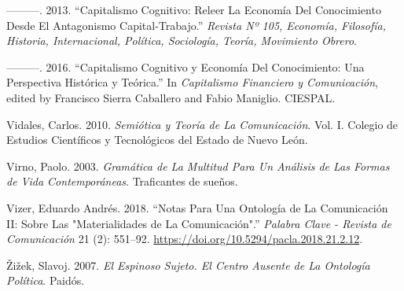 \documentclass[
]{interact}
\newlength{\cslhangindent}
\newenvironment{CSLReferences}[2] %
 {\begin{list}{}{%
  \setlength{\itemindent}{0pt}
  \setlength{\leftmargin}{0pt}
  \setlength{\parsep}{0pt}
  \ifodd #1
   \setlength{\leftmargin}{\cslhangindent}
   \setlength{\itemindent}{-1\cslhangindent}
  \fi
  \setlength{\itemsep}{#2\baselineskip}}}
 {\end{list}}
\begin{document}
\begin{CSLReferences}{1}{0}
---------. 2013. {``Capitalismo Cognitivo: {Releer} La Economía Del
Conocimiento Desde El Antagonismo Capital-Trabajo.''} \emph{Revista Nº
105, Economía, Filosofía, Historia, Internacional, Política, Sociología,
Teoría, Movimiento Obrero}.

---------. 2016. {``Capitalismo Cognitivo y Economía Del Conocimiento:
{Una} Perspectiva Histórica y Teórica.''} In \emph{Capitalismo
Financiero y Comunicación}, edited by Francisco Sierra Caballero and
Fabio Maniglio. CIESPAL.

Vidales, Carlos. 2010. \emph{Semiótica y Teoría de La Comunicación}.
Vol. I. Colegio de Estudios Científicos y Tecnológicos del Estado de
Nuevo León.

Virno, Paolo. 2003. \emph{Gramática de La Multitud {Para} Un Análisis de
Las Formas de Vida Contemporáneas}. Traficantes de sueños.

Vizer, Eduardo Andrés. 2018. {``Notas Para Una Ontología de La
Comunicación {II}: Sobre Las "{Materialidades} de La Comunicación".''}
\emph{Palabra Clave - Revista de Comunicación} 21 (2): 551--92.
\url{https://doi.org/10.5294/pacla.2018.21.2.12}.

Žižek, Slavoj. 2007. \emph{El Espinoso Sujeto. {El} Centro Ausente de La
Ontología Política}. Paidós.

\end{CSLReferences}
\end{document}
